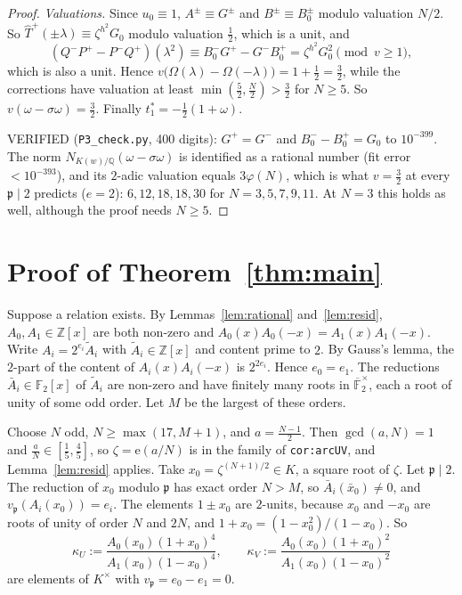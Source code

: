 \documentclass[11pt]{article}
\theoremstyle{remark}
\newcommand{\Q}{\mathbb Q}
\newcommand{\Z}{\mathbb Z}
\newcommand{\e}{\mathrm e}
\begin{document}
\begin{proof}
\emph{Valuations.} Since $u_0\equiv1$, $A^\pm\equiv G^\pm$ and $B^\pm\equiv B^\pm_0$ modulo valuation $N/2$.
So $\hat T^+(\pm\lambda)\equiv\zeta^{h^2}G_0$ modulo valuation $\frac12$, which is a unit, and
\[
   (Q^-P^+-P^-Q^+)(\lambda^2)\equiv B^-_0G^+-G^-B^+_0=\zeta^{h^2}G_0^2\pmod{v\ge1},
\]
which is also a unit. Hence $v\bigl(\Omega(\lambda)-\Omega(-\lambda)\bigr)=1+\frac12=\frac32$, while the
corrections have valuation at least $\min(\frac52,\frac N2)>\frac32$ for $N\ge5$. So
$v(\omega-\sigma\omega)=\frac32$. Finally $t_1^\ast=-\frac12(1+\omega)$.

VERIFIED (\texttt{P3\_check.py}, 400 digits): $G^+=G^-$ and $B^-_0-B^+_0=G_0$ to $10^{-399}$. The norm
$N_{K(w)/\Q}(\omega-\sigma\omega)$ is identified as a rational number (fit error $<10^{-393}$), and its
$2$-adic valuation equals $3\varphi(N)$, which is what $v=\frac32$ at every $\mathfrak p\mid2$ predicts
($e=2$): $6,12,18,18,30$ for $N=3,5,7,9,11$. At $N=3$ this holds as well, although the proof needs $N\ge5$.
\end{proof}

\section{Proof of Theorem~\ref{thm:main}}\label{sec:proof}

Suppose a relation exists. By Lemmas~\ref{lem:rational} and~\ref{lem:resid}, $A_0,A_1\in\Z[x]$ are both
non-zero and $A_0(x)A_0(-x)=A_1(x)A_1(-x)$. Write $A_i=2^{e_i}\tilde A_i$ with $\tilde A_i\in\Z[x]$ and
content prime to $2$. By Gauss's lemma, the $2$-part of the content of $A_i(x)A_i(-x)$ is $2^{2e_i}$. Hence
$e_0=e_1$. The reductions $\bar A_i\in\mathbb F_2[x]$ of $\tilde A_i$ are non-zero and have finitely many
roots in $\overline{\mathbb F}_2^\times$, each a root of unity of some odd order. Let $M$ be the largest of
these orders.

Choose $N$ odd, $N\ge\max(17,M+1)$, and $a=\frac{N-1}2$. Then $\gcd(a,N)=1$ and $\frac aN\in[\frac15,\frac45]$,
so $\zeta=\e(a/N)$ is in the family of \texttt{cor:arcUV}, and Lemma~\ref{lem:resid} applies. Take
$x_0=\zeta^{(N+1)/2}\in K$, a square root of $\zeta$. Let $\mathfrak p\mid2$. The reduction of $x_0$ modulo
$\mathfrak p$ has exact order $N>M$, so $\bar A_i(\bar x_0)\ne0$, and $v_{\mathfrak p}(A_i(x_0))=e_i$. The
elements $1\pm x_0$ are $2$-units, because $x_0$ and $-x_0$ are roots of unity of order $N$ and $2N$, and
$1+x_0=(1-x_0^2)/(1-x_0)$. So
\[
   \kappa_U:=\frac{A_0(x_0)(1+x_0)^4}{A_1(x_0)(1-x_0)^4},\qquad
   \kappa_V:=\frac{A_0(x_0)(1+x_0)^2}{A_1(x_0)(1-x_0)^2}
\]
are elements of $K^\times$ with $v_{\mathfrak p}=e_0-e_1=0$.
\end{document}
